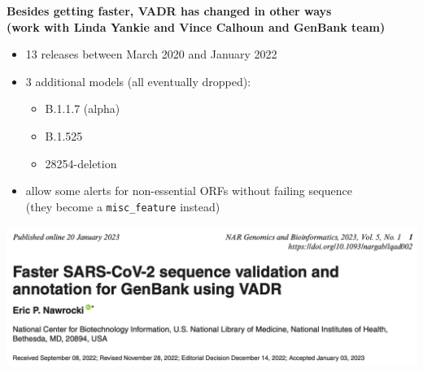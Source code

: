 \documentclass[landscape]{slides}
\begin{document}
\begin{slide}
\begin{center}
\textbf{Besides getting faster, VADR has changed in other ways \\ (work with Linda Yankie and Vince Calhoun and GenBank team)}

\begin{itemize}
\item 13 releases between March 2020 and January 2022
\item 3 additional models (all eventually dropped):
  \begin{itemize}
  \item B.1.1.7 (alpha)
  \item B.1.525
  \item 28254-deletion
  \end{itemize}
\item allow some alerts for non-essential ORFs without failing sequence \\ (they become a \texttt{misc\_feature} instead)
\end{itemize}

\end{center}

\vfill
\end{slide}
\begin{slide}
  \begin{center}
\includegraphics[width=10.5in]{figs/vadr-sarscov2-paper}
\end{center}

\vfill
\end{slide}
\end{document}
